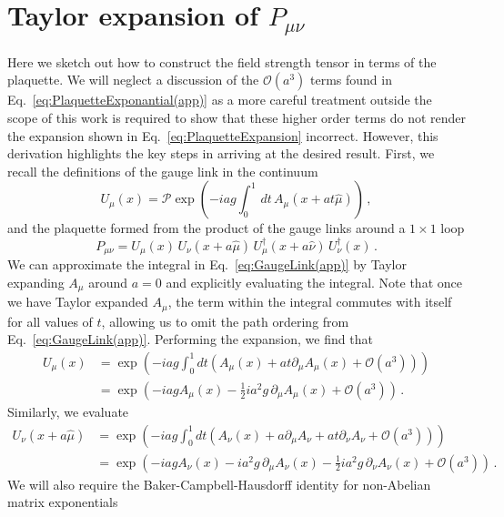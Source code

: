 \section{Taylor expansion of $P_{\mu\nu}$}\label{app:TEPlaquette}
Here we sketch out how to construct the field strength tensor in terms of the plaquette. We will neglect a discussion of the $\mathcal{O}(a^3)$ terms found in Eq.~\eqref{eq:PlaquetteExponantial(app)} as a more careful treatment outside the scope of this work is required to show that these higher order terms do not render the expansion shown in Eq.~\eqref{eq:PlaquetteExpansion} incorrect. However, this derivation highlights the key steps in arriving at the desired result. First, we recall the definitions of the gauge link in the continuum
%
\begin{equation}
U_\mu(x) = \mathcal{P}\exp\left(-iag\int_0^1 \,dt \,A_\mu(x + at\hat{\mu})\right)  \, ,
\label{eq:GaugeLink(app)}
\end{equation}
%
and the plaquette formed from the product of the gauge links around a $1\times 1$ loop
\begin{equation}
P_{\mu\nu} = U_\mu(x)\,U_\nu(x+a\hat{\mu})\,U^\dagger_\mu(x+a\hat{\nu})\,U^\dagger_\nu(x)\, .
\label{eq:Plaquette(app)}
\end{equation}
%
We can approximate the integral in Eq.~\eqref{eq:GaugeLink(app)} by Taylor expanding $A_\mu$ around $a=0$ and explicitly evaluating the integral. Note that once we have Taylor expanded $A_\mu$, the term within the integral commutes with itself for all values of $t$, allowing us to omit the path ordering from Eq.~\eqref{eq:GaugeLink(app)}. Performing the expansion, we find that
%
\begin{align}
U_\mu(x)&=\exp\left(-iag\int_0^1 dt \left(A_\mu\left(x\right) + at\partial_\mu A_\mu(x) + \mathcal{O}(a^3)\right)\right)\nonumber\\
&=\exp\left(-iag A_\mu\left(x\right) - \frac{1}{2}ia^2 g\, \partial_\mu A_\mu\left(x\right)+ \mathcal{O}(a^3)\right)\, . \label{eq:UTaylor}
\end{align}
%
Similarly, we evaluate
%
\begin{align}
U_\nu(x+a\hat{\mu}) &= \exp\left(-iag\int_0^1 dt \left(A_\nu(x) + a\partial_\mu A_\nu + at\partial_\nu A_\nu + \mathcal{O}(a^3)\right)\right)\nonumber\\
&= \exp\left(-iag A_\nu(x) - ia^2g\,\partial_\mu A_\nu(x) - \frac{1}{2}ia^2 g\,\partial_\nu A_\nu(x)+ \mathcal{O}(a^3)\right)\, . \label{eq:UTaylor2}
\end{align}
%
We will also require the Baker-Campbell-Hausdorff identity for non-Abelian matrix exponentials
